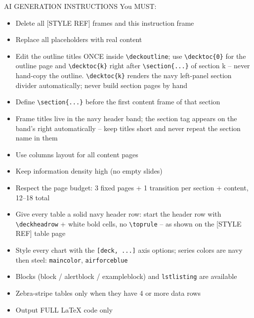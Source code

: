 \documentclass[aspectratio=169,10pt,xcolor=table]{beamer}
\begin{document}
\begin{frame}[allowframebreaks]{AI GENERATION INSTRUCTIONS}
You MUST:
\begin{itemize}
\item Delete all [STYLE REF] frames and this instruction frame
\item Replace all placeholders with real content
\item Edit the outline titles ONCE inside \texttt{\textbackslash deckoutline};
      use \texttt{\textbackslash decktoc\{0\}} for the outline page and
      \texttt{\textbackslash decktoc\{k\}} right after \texttt{\textbackslash section\{...\}}
      of section k -- never hand-copy the outline.
      \texttt{\textbackslash decktoc\{k\}} renders the navy left-panel section
      divider automatically; never build section pages by hand
\item Define \texttt{\textbackslash section\{...\}} before the first content frame of that section
\item Frame titles live in the navy header band; the section tag appears on the
      band's right automatically -- keep titles short and never repeat the
      section name in them
\item Use columns layout for all content pages
\item Keep information density high (no empty slides)
\item Respect the page budget: 3 fixed pages + 1 transition per section + content, 12--18 total
\item Give every table a solid navy header row: start the header row with
      \texttt{\textbackslash deckheadrow} + white bold cells, no
      \texttt{\textbackslash toprule} -- as shown on the [STYLE REF] table page
\item Style every chart with the \texttt{[deck, ...]} axis options; series
      colors are navy then steel: \texttt{maincolor}, \texttt{airforceblue}
\item Blocks (block / alertblock / exampleblock) and \texttt{lstlisting} are available
\item Zebra-stripe tables only when they have 4 or more data rows
\item Output FULL LaTeX code only
\end{itemize}
\end{frame}

\QApage
\end{document}
